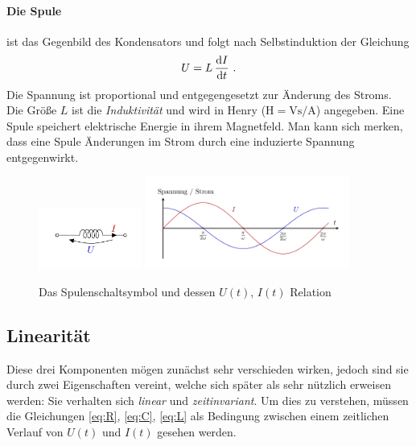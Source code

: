 \paragraph*{Die Spule}
ist das Gegenbild des Kondensators und folgt nach Selbstinduktion der Gleichung
\begin{equation}\label{eq:L}
    U = L\,\dv{I}{t} ~.
\end{equation}
Die Spannung ist proportional und entgegengesetzt zur Änderung des Stroms. Die Größe $L$ ist die \emph{Induktivität} und
wird in Henry ($\si{\henry} = \si{\volt\second}/\si{\ampere}$) angegeben. Eine Spule speichert elektrische Energie in
ihrem Magnetfeld. Man kann sich merken, dass eine Spule Änderungen im Strom durch eine induzierte Spannung
entgegenwirkt.
\begin{figure}[H]
    \centering
    \includegraphics[width=0.3\textwidth]{kBL.pdf}
    \includegraphics[width=0.6\textwidth]{kPL.pdf}
    \caption{Das Spulenschaltsymbol und dessen $U(t),\, I(t)$ Relation}
\end{figure}

\subsection{Linearität}
Diese drei Komponenten mögen zunächst sehr verschieden wirken, jedoch sind sie durch zwei Eigenschaften vereint, welche
sich später als sehr nützlich erweisen werden: Sie verhalten sich \emph{linear} und \emph{zeitinvariant}. Um dies zu
verstehen, müssen die Gleichungen \eqref{eq:R}, \eqref{eq:C}, \eqref{eq:L} als Bedingung zwischen einem zeitlichen
Verlauf von $U(t)$ und $I(t)$ gesehen werden.

